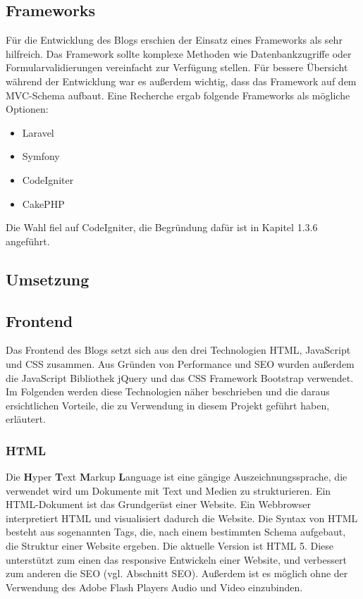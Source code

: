     \subsection*{Frameworks}
    Für die Entwicklung des Blogs erschien der Einsatz eines Frameworks als sehr hilfreich. Das Framework sollte komplexe Methoden wie
    Datenbankzugriffe oder Formularvalidierungen vereinfacht zur Verfügung stellen. Für bessere Übersicht während der Entwicklung war es außerdem
    wichtig, dass das Framework auf dem MVC-Schema aufbaut. Eine Recherche ergab folgende Frameworks als mögliche
    Optionen:

    \begin{itemize}
      \item Laravel
      \item Symfony
      \item CodeIgniter
      \item CakePHP
    \end{itemize}

    Die Wahl fiel auf CodeIgniter, die Begründung dafür ist in Kapitel 1.3.6 angeführt.

  \subsection{Umsetzung}

    \subsection*{Frontend}
    Das Frontend des Blogs setzt sich aus den drei Technologien HTML, JavaScript und CSS zusammen. Aus Gründen von Performance und SEO wurden außerdem
    die JavaScript Bibliothek jQuery und das CSS Framework Bootstrap verwendet. Im Folgenden werden diese Technologien näher beschrieben und die daraus
    ersichtlichen Vorteile, die zu Verwendung in diesem Projekt geführt haben, erläutert.

      \subsubsection*{HTML}
      Die {\textbf{H}yper \textbf{T}ext \textbf{M}arkup \textbf{L}anguage\cite{html}} ist eine gängige Auszeichnungssprache, die verwendet wird um Dokumente mit Text und Medien zu strukturieren.
      Ein HTML-Dokument ist das Grundgerüst einer Website. Ein Webbrowser interpretiert
      HTML und visualisiert dadurch die Website. Die Syntax von HTML besteht aus sogenannten Tags, die, nach einem
      bestimmten Schema aufgebaut, die Struktur einer Website ergeben. Die aktuelle Version ist HTML 5. Diese unterstützt zum einen das responsive
      Entwickeln einer Website, und verbessert zum anderen die SEO (vgl. Abschnitt SEO). Außerdem ist es möglich ohne der Verwendung des Adobe Flash Players Audio und Video einzubinden.

